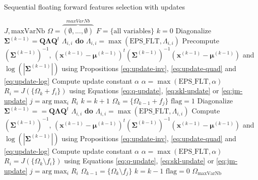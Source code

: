 \documentclass[journal,peerreview,onecolumn]{IEEEtran}
\begin{document}
    \begin{algorithm}
    \caption{Sequential floating forward features selection with updates\label{alg:sffs-update}}
    {\footnotesize
    \begin{algorithmic}[1]
    \REQUIRE $J,\text{maxVarNb}$
    \STATE $\Omega=\overbrace{(\emptyset,...,\emptyset)}^{maxVarNb}$
    \STATE $F=\text{\{all variables\}}$
    \STATE $k=0$
    \STATE Diagonalize $\boldsymbol{\Sigma}^{(k-1)} = \mathbf{Q} \boldsymbol{\Lambda} \mathbf{Q}^t$
     $\Lambda_{i,i}$ {\bfseries do} $\Lambda_{i,i} = \max (\text{EPS\_FLT},\Lambda_{i,i})$
    \STATE Precompute {\scriptsize $(\boldsymbol{\Sigma}^{(k-1)})^{-1}$, $(\mathbf{x}^{(k-1)} - \boldsymbol{\mu}^{(k-1)})^t (\boldsymbol{\Sigma}^{(k-1)})^{-1} (\mathbf{x}^{(k-1)}- \boldsymbol{\mu}^{(k-1)})$ and $\log \left(|\boldsymbol{\Sigma}^{(k-1)}|\right)$} using Propositions \ref{eq:update-inv}, \ref{eq:update-quad} and \ref{eq:update-log}
    \STATE Compute update constant $\alpha$
    \STATE $\alpha = \max (\text{EPS\_FLT},\alpha)$
    \STATE $R_i = J(\{\Omega_k + f_i\})$ using Equations \ref{eq:q-update}, \ref{eq:skl-update} or \ref{eq:jm-update}
    \ENDFOR
    \STATE $j=\text{arg} \max_{i} R_i$
    \STATE $k=k+1$
    \STATE $\Omega_k = \{\Omega_{k-1} + f_j\}$
    \STATE $\text{flag}=1$
    \STATE Diagonalize $\boldsymbol{\Sigma}^{(k-1)} = = \mathbf{Q} \boldsymbol{\Lambda} \mathbf{Q}^t$
     $\Lambda_{i,i}$ {\bfseries do} $\Lambda_{i,i} = \max (\text{EPS\_FLT},\Lambda_{i,i})$
    \STATE Compute {\scriptsize $(\boldsymbol{\Sigma}^{(k-1)})^{-1}$, $(\mathbf{x}^{(k-1)} - \boldsymbol{\mu}^{(k-1)})^t (\boldsymbol{\Sigma}^{(k-1)})^{-1} (\mathbf{x}^{(k-1)}- \boldsymbol{\mu}^{(k-1)})$ and $\log \left(|\boldsymbol{\Sigma}^{(k-1)}|\right)$} using Propositions \ref{eq:update-inv}, \ref{eq:update-quad} and \ref{eq:update-log}
    \STATE Compute update constant $\alpha$
    \STATE $\alpha = \max (\text{EPS\_FLT},\alpha)$
    \STATE $R_i = J(\{\Omega_k \setminus f_i\})$ using Equations \ref{eq:q-update}, \ref{eq:skl-update} or \ref{eq:jm-update}
    \ENDFOR
    \STATE $j=\text{arg} \max_{i} R_i$
    \STATE $\Omega_{k-1} = \{\Omega_k \setminus f_j\}$
    \STATE $k=k-1$
    \ELSE
    \STATE $\text{flag}=0$
    \ENDIF
    \ENDWHILE
    \ENDIF
    \ENDWHILE
    \RETURN $\Omega_{\text{maxVarNb}}$
    \end{algorithmic}
    }
    \end{algorithm}
\end{document}
